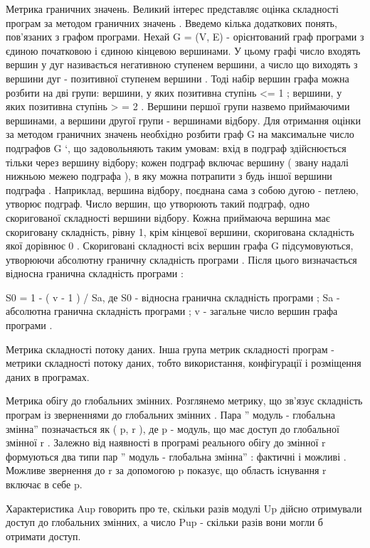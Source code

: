 Метрика граничних значень.
Великий інтерес представляє оцінка складності програм за методом граничних значень .
Введемо кілька додаткових понять, пов'язаних з графом програми.
Нехай G = (V, E) - орієнтований граф програми з єдиною початковою і єдиною кінцевою вершинами. У цьому графі число входять вершин у дуг називається негативною ступенем вершини, а число що виходять з вершини дуг - позитивної ступенем вершини . Тоді набір вершин графа можна розбити на дві групи: вершини, у яких позитивна ступінь \textless{}= 1 ; вершини, у яких позитивна ступінь \textgreater{} = 2 .
Вершини першої групи назвемо приймаючими вершинами, а вершини другої групи - вершинами відбору.
Для отримання оцінки за методом граничних значень необхідно розбити граф G на максимальне число подграфов G `, що задовольняють таким умовам: вхід в подграф здійснюється тільки через вершину відбору; кожен подграф включає вершину ( звану надалі нижньою межею подграфа ), в яку можна потрапити з будь іншої вершини подграфа . Наприклад, вершина відбору, поєднана сама з собою дугою - петлею, утворює подграф.
Число вершин, що утворюють такий подграф, одно скоригованої складності вершини відбору. Кожна приймаюча вершина має скориговану складність, рівну 1, крім кінцевої вершини, скоригована складність якої дорівнює 0 . Скориговані складності всіх вершин графа G підсумовуються, утворюючи абсолютну граничну складність програми . Після цього визначається відносна гранична складність програми :

S0 = 1 - ( v - 1 ) / Sa,
де S0 - відносна гранична складність програми ; Sa - абсолютна гранична складність програми ; v - загальне число вершин графа програми .

Метрика складності потоку даних.
Інша група метрик складності програм - метрики складності потоку даних, тобто використання, конфігурації і розміщення даних в програмах.

Метрика обігу до глобальних змінних.
Розглянемо метрику, що зв'язує складність програм із зверненнями до глобальних змінних .
Пара '' модуль - глобальна змінна'' позначається як ( p, r ), де p - модуль, що має доступ до глобальної змінної r . Залежно від наявності в програмі реального обігу до змінної r формуються два типи пар '' модуль - глобальна змінна'' : фактичні і можливі . Можливе звернення до r за допомогою p показує, що область існування r включає в себе p.

Характеристика Aup говорить про те, скільки разів модулі Up дійсно отримували доступ до глобальних змінних, а число Pup - скільки разів вони могли б отримати доступ.

